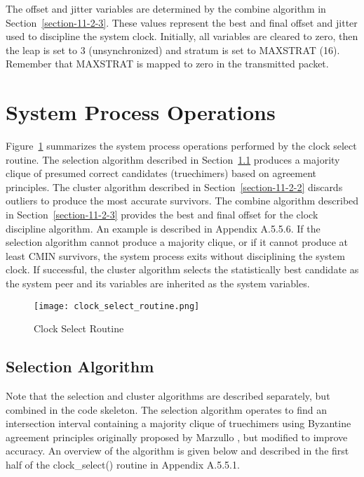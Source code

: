 The offset and jitter variables are determined by the combine
algorithm in Section~\ref{section-11-2-3}. These values represent the best and
final offset and jitter used to discipline the system clock.
Initially, all variables are cleared to zero, then the leap is set to
3 (unsynchronized) and stratum is set to MAXSTRAT (16). Remember
that MAXSTRAT is mapped to zero in the transmitted packet.

\section{System Process Operations}
\label{section-11-2}

Figure~\ref{clock_select_routine} summarizes the system process operations performed by the
clock select routine. The selection algorithm described in
Section~\ref{section-11-2-1} produces a majority clique of presumed correct
candidates (truechimers) based on agreement principles. The cluster
algorithm described in Section~\ref{section-11-2-2} discards outliers to produce
the most accurate survivors. The combine algorithm described in
Section~\ref{section-11-2-3} provides the best and final offset for the clock
discipline algorithm. An example is described in Appendix A.5.5.6.
If the selection algorithm cannot produce a majority clique, or if it
cannot produce at least CMIN survivors, the system process exits
without disciplining the system clock. If successful, the cluster
algorithm selects the statistically best candidate as the system peer
and its variables are inherited as the system variables.

\begin{figure}
\centering
\texttt{[image: clock\_select\_routine.png]}
\caption{Clock Select Routine}
\label{clock_select_routine}
\end{figure}

\subsection{Selection Algorithm}
\label{section-11-2-1}

Note that the selection and cluster algorithms are described
separately, but combined in the code skeleton. The selection
algorithm operates to find an intersection interval containing a
majority clique of truechimers using Byzantine agreement principles
originally proposed by Marzullo \cite{ref6}, but modified to improve
accuracy. An overview of the algorithm is given below and described
in the first half of the clock\_select() routine in Appendix A.5.5.1.

